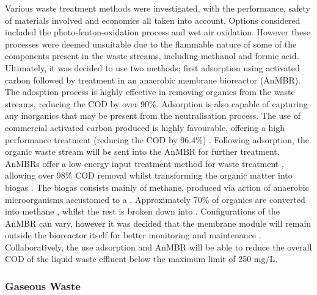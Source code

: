 Various waste treatment methods were investigated, with the performance,  safety of materials involved and economics all taken into account. Options considered included the photo-fenton-oxidation process and wet air oxidation. However these processes were deemed unsuitable due to the flammable nature of some of the components present in the waste streams, including methanol and formic acid. Ultimately, it was decided to use two methods; first adsorption using activated carbon followed by treatment in an anaerobic membrane bioreactor (AnMBR). The adosption process is highly effective in removing organics from the waste streams, reducing the COD by over 90\%. Adsorption is also capable of capturing any inorganics that may be present from the neutralisation process. The use of commercial activated carbon produced is highly favourable,  offering a high performance treatment (reducing the COD by 96.4\%) \cite{aluyor_cod_2008}. Following adsorption, the organic waste stream will be sent into the AnMBR for further treatment. AnMBRs offer a low energy input treatment method for waste treatment \cite{maaz_anaerobic_2019}, allowing over 98\% COD removal whilst transforming the organic matter into biogas \cite{chen_brewery_2016}. The biogas consists mainly of methane, produced via action of anaerobic microorganisms accustomed to a  . Approximately 70\% of organics are converted into methane \cite{ariunbaatar_performance_2021}, whilst the rest is broken down into . Configurations of the AnMBR can vary, however it was decided that the membrane module will remain outside the bioreactor itself for better monitoring and maintenance \cite{maaz_anaerobic_2019}. Collaboratively, the use adsorption and AnMBR will be able to reduce the overall COD of the liquid waste effluent below the maximum limit of 250 mg/L. 

\subsubsection{Gaseous Waste}

